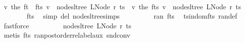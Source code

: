\begin{isabellebody}
\isanewline
\isanewline
\ \ \ \ \isamarkupfalse%
\ {\isachardoublequoteopen}{\isacharparenleft}{\kern0pt}{\isasymlambda}v{\isachardot}{\kern0pt}\ the\ {\isacharparenleft}{\kern0pt}{\isacharparenleft}{\kern0pt}f{\isacharunderscore}{\kern0pt}t\ {\isacharplus}{\kern0pt}{\isacharplus}{\kern0pt}\ f{\isacharunderscore}{\kern0pt}ts{\isacharparenright}{\kern0pt}\ v{\isacharparenright}{\kern0pt}{\isacharparenright}{\kern0pt}\ {\isacharbackquote}{\kern0pt}\ nodes{\isacharunderscore}{\kern0pt}ltree\ {\isacharparenleft}{\kern0pt}LNode\ r{\isacharprime}{\kern0pt}\ ts{\isacharprime}{\kern0pt}{\isacharparenright}{\kern0pt}\ {\isacharequal}{\kern0pt}\ {\isacharparenleft}{\kern0pt}{\isasymlambda}v{\isachardot}{\kern0pt}\ the\ {\isacharparenleft}{\kern0pt}f{\isacharunderscore}{\kern0pt}ts\ v{\isacharparenright}{\kern0pt}{\isacharparenright}{\kern0pt}\ {\isacharbackquote}{\kern0pt}\ nodes{\isacharunderscore}{\kern0pt}ltree\ {\isacharparenleft}{\kern0pt}LNode\ r{\isacharprime}{\kern0pt}\ ts{\isacharprime}{\kern0pt}{\isacharparenright}{\kern0pt}{\isachardoublequoteclose}\isanewline
\ \ \ \ \ \ \isamarkupfalse%
\ f{\isacharunderscore}{\kern0pt}ts{\isacharprime}{\kern0pt}\ \isamarkupfalse%
\ {\isacharparenleft}{\kern0pt}simp\ del{\isacharcolon}{\kern0pt}\ nodes{\isacharunderscore}{\kern0pt}ltree{\isachardot}{\kern0pt}simps{\isacharparenright}{\kern0pt}\isanewline
\ \ \ \ \isamarkupfalse%
\ \isamarkupfalse%
\ {\isachardoublequoteopen}{\isasymdots}\ {\isasymsubseteq}\ ran\ f{\isacharunderscore}{\kern0pt}ts{\isachardoublequoteclose}\ \isamarkupfalse%
\ ts{\isacharprime}{\kern0pt}{\isacharunderscore}{\kern0pt}in{\isacharunderscore}{\kern0pt}dom{\isacharunderscore}{\kern0pt}f{\isacharunderscore}{\kern0pt}ts\ ran{\isacharunderscore}{\kern0pt}def\ \isamarkupfalse%
\ fastforce\isanewline
\ \ \ \ \isamarkupfalse%
\ \isamarkupfalse%
\ {\isachardoublequoteopen}{\isasymdots}\ {\isacharequal}{\kern0pt}\ nodes{\isacharunderscore}{\kern0pt}ltree\ {\isacharparenleft}{\kern0pt}LNode\ r\ ts{\isacharparenright}{\kern0pt}{\isachardoublequoteclose}\ \isamarkupfalse%
\ {\isacharparenleft}{\kern0pt}metis\ f{\isacharunderscore}{\kern0pt}ts\ ran{\isacharunderscore}{\kern0pt}postorder{\isacharunderscore}{\kern0pt}relabel{\isacharunderscore}{\kern0pt}aux\ snd{\isacharunderscore}{\kern0pt}conv{\isacharparenright}{\kern0pt}\isanewline
\ \ \ \ \isamarkupfalse%
\ \isamarkupfalse%

\end{isabellebody}
